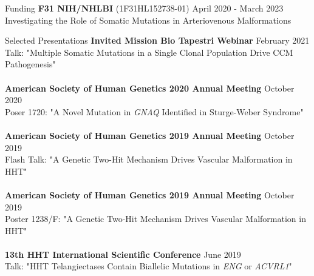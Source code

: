 \documentclass{resume} %
\begin{document}
\begin{rSection}{Funding}
{\bf F31 NIH/NHLBI  }{(1F31HL152738-01)}  \hfill {April 2020 - March 2023}\\
Investigating the Role of Somatic Mutations in Arteriovenous Malformations\\
\end{rSection}


\begin{rSection}{Selected Presentations}
{\bf Invited Mission Bio Tapestri Webinar} \hfill {February  2021}\\
Talk: "Multiple Somatic Mutations in a Single Clonal Population Drive CCM Pathogenesis"\\\\
{\bf American Society of Human Genetics 2020 Annual Meeting} \hfill {October 2020}\\
Poser 1720: "A Novel Mutation in \textit{GNAQ} Identified in Sturge-Weber Syndrome"\\\\
{\bf American Society of Human Genetics 2019 Annual Meeting} \hfill {October 2019}\\
Flash Talk: "A Genetic Two-Hit Mechanism Drives Vascular Malformation in HHT"\\\\
{\bf American Society of Human Genetics 2019 Annual Meeting} \hfill {October 2019}\\
Poster 1238/F: "A Genetic Two-Hit Mechanism Drives Vascular Malformation in HHT"\\\\
{\bf 13th HHT International Scientific Conference} \hfill {June 2019}\\
Talk: "HHT Telangiectases Contain Biallelic Mutations in \textit{ENG} or \textit{ACVRL1}"\\

\end{rSection}
\end{document}
